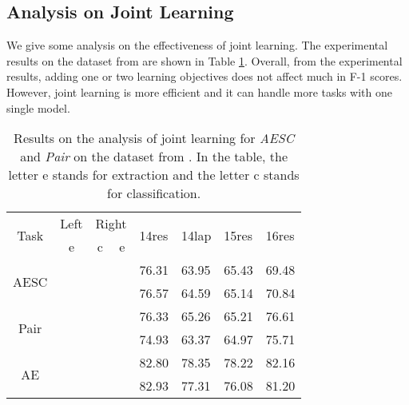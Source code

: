 \documentclass[letterpaper]{article} \usepackage{aaai21}  \usepackage{times}  \usepackage{helvet} \usepackage{courier}  \usepackage[hyphens]{url}  \usepackage{graphicx} \urlstyle{rm} \def\UrlFont{\rm}  \usepackage{natbib}  \usepackage{caption}
\begin{document}
\subsection{Analysis on Joint Learning}
We give some analysis on the effectiveness of joint learning. 
The experimental results on the dataset from \cite{peng2020knowing} are shown in Table \ref{analysis_joint}.
Overall, from the experimental results, adding one or two learning objectives does not affect much in F-1 scores. 
However, joint learning is more efficient and it can handle more tasks with one single model.  

\begin{table}
    \centering
    \small
    \begin{tabular}{c|c|c|c|l|l|l|l}
        \hline
        \multirow{2}{*}{Task}                   & Left  & \multicolumn{2}{c|}{Right} & \multirow{2}{*}{14res} & \multirow{2}{*}{14lap} & \multirow{2}{*}{15res} & \multirow{2}{*}{16res} \\ \cline{2-4}
                              & e & c      & e      &                        &                        &                        &                        \\ \hline
        \multirow{2}{*}{AESC} &         &             &                & 76.31                  & 63.95                  & 65.43                  & 69.48                  \\ \cline{2-8} 
                              &         &             &              & 76.57           & 64.59           & 65.14         & 70.84         \\ \hline
        \multirow{2}{*}{Pair} &         &               &              & 76.33                  & 65.26                  & 65.21                  & 76.61                  \\ \cline{2-8} 
                              &         &             &              & 74.93           & 63.37          & 64.97          & 75.71           \\ \hline
        \multirow{2}{*}{AE}   &         &               &                & 82.80                  & 78.35                  & 78.22                  & 82.16                  \\ \cline{2-8} 
                              &         &             &              & 82.93           &      77.31                   & 76.08       & 81.20          \\ \hline
        \end{tabular}
    \caption{Results on the analysis of joint learning for \emph{AESC} and \emph{Pair} on the dataset from \cite{peng2020knowing}.
    In the table, the letter e stands for extraction and the letter c stands for classification. } \label{analysis_joint}
    \end{table}
    
\end{document}
